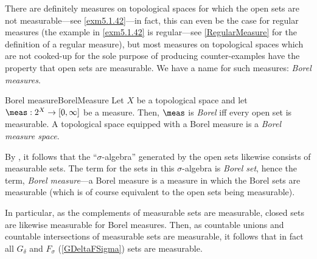 There are definitely measures on topological spaces for which the open sets are not measurable---see \cref{exm5.1.42}---in fact, this can even be the case for regular measures (the example in \cref{exm5.1.42} is regular---see \cref{RegularMeasure} for the definition of a regular measure), but most measures on topological spaces which are not cooked-up for the sole purpose of producing counter-examples have the property that open sets are measurable.  We have a name for such measures:  \emph{Borel measures}.
\begin{dfn}{Borel measure}{BorelMeasure}
Let $X$ be a topological space and let $\meas :2^X\rightarrow [0,\infty ]$ be a measure.  Then, $\meas$ is \emph{Borel} iff every open set is measurable.  A topological space equipped with a Borel measure is a \emph{Borel measure space}.
\begin{rmk}
By , it follows that the ``$\sigma$-algebra'' generated by the open sets likewise consists of measurable sets.  The term for the sets in this $\sigma$-algebra is \emph{Borel set}, hence the term, \emph{Borel measure}---a Borel measure is a measure in which the Borel sets are measurable (which is of course equivalent to the open sets being measurable).
\end{rmk}
\begin{rmk}
In particular, as the complements of measurable sets are measurable, closed sets are likewise measurable for Borel measures.  Then, as countable unions and countable intersections of measurable sets are measurable, it follows that in fact all $G_{\delta}$ and $F_{\sigma}$ (\cref{GDeltaFSigma}) sets are measurable.
\end{rmk}
\end{dfn}

